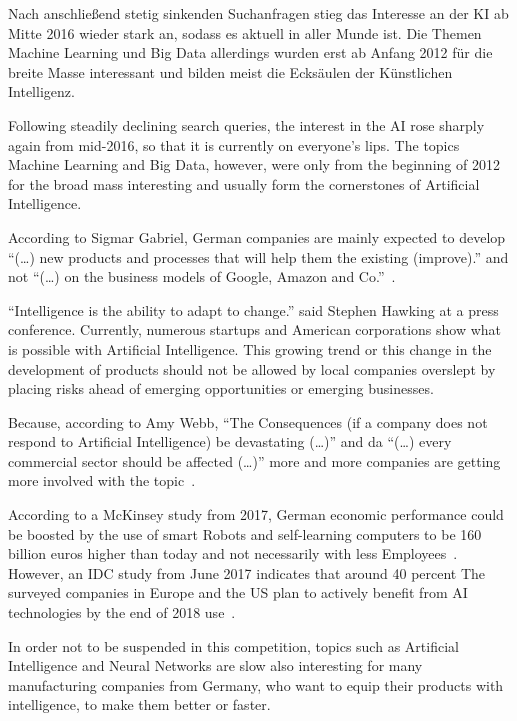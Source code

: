Nach anschließend stetig sinkenden Suchanfragen stieg das Interesse an der KI ab Mitte 2016 wieder stark an, sodass es
aktuell in aller Munde ist. Die Themen Machine Learning und Big Data allerdings wurden erst ab Anfang 2012 für die
breite Masse interessant und bilden meist die Ecksäulen der Künstlichen Intelligenz.

Following steadily declining search queries, the interest in the AI rose sharply again from mid-2016, so that it is
currently on everyone's lips. The topics Machine Learning and Big Data, however, were only from the beginning of 2012
for the broad mass interesting and usually form the cornerstones of Artificial Intelligence.

According to Sigmar Gabriel, German companies are mainly expected to develop \enquote{(\ldots) new products and
processes that will help them the existing (improve).} and not \enquote{(\ldots) on the business models of Google,
Amazon and Co.}~\cite{article_einleitung_ww_sg}.

\enquote{Intelligence is the ability to adapt to change.} said Stephen Hawking at a press conference. Currently,
numerous startups and American corporations show what is possible with Artificial Intelligence. This growing trend or
this change in the development of products should not be allowed by local companies overslept by placing risks ahead of
emerging opportunities or emerging businesses.

Because, according to Amy Webb, \enquote{The Consequences (if a company does not respond to Artificial Intelligence)
be devastating (\ldots)} and da \enquote{(\ldots) every commercial sector should be affected (\ldots)} more and more
companies are getting more involved with the topic~\cite{article_einleitung_dub_aw}.

According to a McKinsey study from 2017, German economic performance could be boosted by the use of smart Robots and
self-learning computers to be 160 billion euros higher than today and not necessarily with less
Employees~\cite{online_einleitung_mckinsey}. However, an IDC study from June 2017 indicates that around 40 percent
The surveyed companies in Europe and the US plan to actively benefit from AI technologies by the end of 2018
use~\cite{article_grundlagen_salesforce}.

In order not to be suspended in this competition, topics such as Artificial Intelligence and Neural Networks are slow
also interesting for many manufacturing companies from Germany, who want to equip their products with intelligence,
to make them better or faster.

